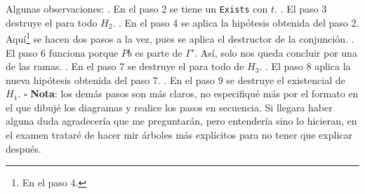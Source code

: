 \documentclass{article}
\newcommand{\code}[1]{\textcolor{white!25!black}{\texttt{#1}}}
\begin{document}
Algunas observaciones:
. En el paso 2 se tiene un \code{Exists} con $t$.
. El paso 3 destruye el para todo $H_2$.
. En el paso 4 se aplica la hipótesis obtenida del paso 2.
Aquí\footnote{En el paso 4.} se hacen dos pasos a la vez, pues se aplica el destructor
de la conjunción.
. El paso 6 funciona porque $Pb$ es parte de $\Gamma'$. Así, solo nos queda concluir
por una de las ramas.
. En el paso 7 se destruye el para todo de $H_3$.
. El paso 8 aplica la nueva hipótesis obtenida del paso 7.
. En el paso 9 se destruye el existencial de $H_1$. \hfill $\square$
\newline
\newline
\textbf{Nota}: los demás pasos son más claros, no especifiqué más por el formato en el
que dibujé los diagramas y realice los pasos en secuencia. Si llegara haber alguna duda
agradecería que me preguntarán, pero entendería sino lo hicieran, en el examen trataré
de hacer mir árboles más explícitos para no tener que explicar después.
\end{document}

